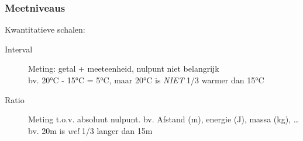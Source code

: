 \begin{frame}
  \frametitle{Meetniveaus}

  Kwantitatieve schalen:

  \begin{description}
    \item[Interval] Meting: getal + meeteenheid, nulpunt niet belangrijk\\
      bv. 20°C - 15°C = 5°C, maar 20°C is \emph{NIET} 1/3 warmer dan 15°C
    \item[Ratio] Meting t.o.v. absoluut nulpunt. bv. Afstand (m), energie (J), massa (kg), \ldots\\
      bv. 20m is \emph{wel} 1/3 langer dan 15m
  \end{description}
\end{frame}
